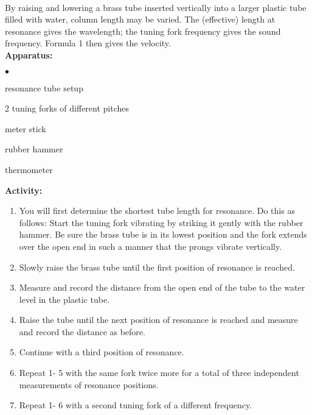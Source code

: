  \\

\noindent By raising and lowering a brass tube inserted vertically into a larger plastic tube filled with water, column length may be varied. The (effective) length at resonance gives the wavelength; the tuning fork frequency gives the sound frequency. Formula 1 then gives the velocity. \\

{\noindent \bf Apparatus:} \begin{list}{$\bullet$}{\itemsep0pt }

\item resonance tube setup \item 2 tuning forks of different pitches \item meter stick \item rubber hammer \item thermometer

\end{list}

{\noindent \bf Activity:} \begin{enumerate}

\item You will first determine the shortest tube length for resonance. Do this as follows: Start the tuning fork vibrating by striking it gently with the rubber hammer. Be sure the brass tube is in its lowest position and the fork extends over the open end in such a manner that the prongs vibrate vertically.

\item Slowly raise the brass tube until the first position of resonance is reached.

\item Measure and record the distance from the open end of the tube to the water level in the plastic tube.

\item Raise the tube until the next position of resonance is reached and measure and record the distance as before.

\item Continue with a third position of resonance.

\item Repeat 1- 5 with the same fork twice more for a total of three independent measurements of resonance positions.

\item Repeat 1- 6 with a second tuning fork of a different frequency.

\end{enumerate}

